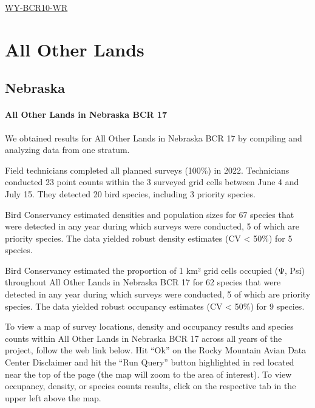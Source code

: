\documentclass[
  letterpaper,
  DIV=11,
  numbers=noendperiod,
  oneside]{scrreprt}
\begin{document}
\href{http://www.rmbo.org/new_site/adc/QueryWindow.aspx\#N4IgzgLgTghhCuBbEAuABCA6gTQLQCEBhAJQEYAGXTY9TASwDsATNYugNwFMpXOxv2cOgHsGIAL5A===}{WY-BCR10-WR}

\hypertarget{all-other-lands}{%
\chapter{All Other Lands}\label{all-other-lands}}

\hypertarget{nebraska}{%
\section{Nebraska}\label{nebraska}}

\hypertarget{all-other-lands-in-nebraska-bcr-17}{%
\subsubsection{All Other Lands in Nebraska BCR
17}\label{all-other-lands-in-nebraska-bcr-17}}

We obtained results for All Other Lands in Nebraska BCR 17 by compiling
and analyzing data from one stratum.

Field technicians completed all planned surveys (100\%) in 2022.
Technicians conducted 23 point counts within the 3 surveyed grid cells
between June 4 and July 15. They detected 20 bird species, including 3
priority species.

Bird Conservancy estimated densities and population sizes for 67 species
that were detected in any year during which surveys were conducted, 5 of
which are priority species. The data yielded robust density estimates
(CV \textless{} 50\%) for 5 species.

Bird Conservancy estimated the proportion of 1 km² grid cells occupied
(Ψ, Psi) throughout All Other Lands in Nebraska BCR 17 for 62 species
that were detected in any year during which surveys were conducted, 5 of
which are priority species. The data yielded robust occupancy estimates
(CV \textless{} 50\%) for 9 species.

To view a map of survey locations, density and occupancy results and
species counts within All Other Lands in Nebraska BCR 17 across all
years of the project, follow the web link below. Hit ``Ok'' on the Rocky
Mountain Avian Data Center Disclaimer and hit the ``Run Query'' button
highlighted in red located near the top of the page (the map will zoom
to the area of interest). To view occupancy, density, or species counts
results, click on the respective tab in the upper left above the map.
\end{document}
